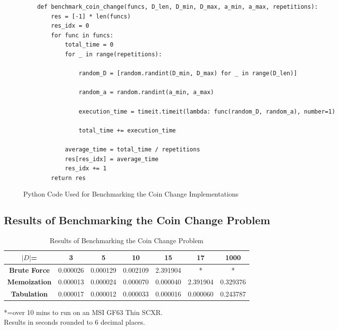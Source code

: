 \begin{figure}[H]
    \centering
    \begin{lstlisting}
    def benchmark_coin_change(funcs, D_len, D_min, D_max, a_min, a_max, repetitions):
        res = [-1] * len(funcs)
        res_idx = 0
        for func in funcs:
            total_time = 0
            for _ in range(repetitions):
    
                random_D = [random.randint(D_min, D_max) for _ in range(D_len)]
    
                random_a = random.randint(a_min, a_max)
                
                execution_time = timeit.timeit(lambda: func(random_D, random_a), number=1)
    
                total_time += execution_time
    
            average_time = total_time / repetitions
            res[res_idx] = average_time
            res_idx += 1
        return res
    \end{lstlisting}
    \caption{Python Code Used for Benchmarking the Coin Change Implementations}
    \label{fig:bm-coin-change}
\end{figure}

\subsection{Results of Benchmarking the Coin Change Problem}
\begin{table}[H]
    \centering
    \begin{tabular}{|c|c|c|c|c|c|c|}
        \hline
        \textbf{$|D|$=}  & \textbf{3} & \textbf{5} & \textbf{10} & \textbf{15} & \textbf{17}  & \textbf{1000} \\
        \hline
        \textbf{Brute Force} & 0.000026 & 0.000129 & 0.002109 & 2.391904 & * & * \\
        \hline
        \textbf{Memoization} & 0.000013 & 0.000024 & 0.000070 & 0.000040 & 2.391904 & 0.329376 \\
        \hline
        \textbf{Tabulation} & 0.000017 & 0.000012 & 0.000033 & 0.000016 & 0.000060 & 0.243787 \\
        \hline
    \end{tabular}
    \caption{Results of Benchmarking the Coin Change Problem}
\end{table}
*=over 10 mins to run on an MSI GF63 Thin SCXR.\\
Results in seconds rounded to 6 decimal places.


